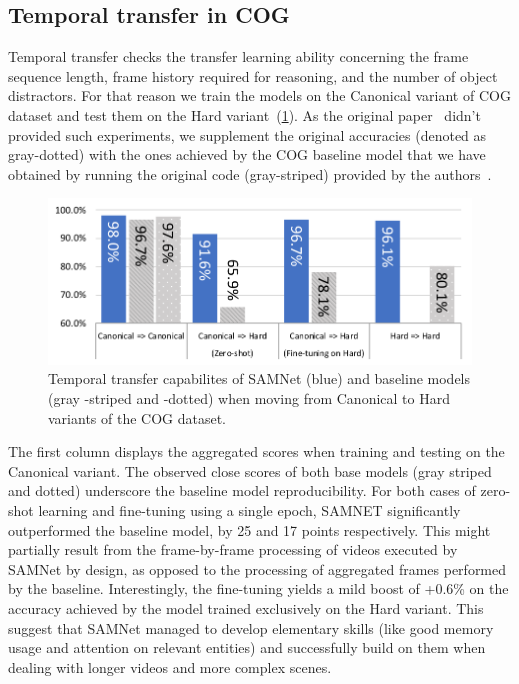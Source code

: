 \subsection{Temporal transfer in COG}
\label{sec:temporal}

Temporal transfer checks the transfer learning ability concerning the frame sequence length, frame history required for reasoning, and the number of object distractors.
For that reason we train the models on the Canonical variant of COG dataset and test them on the Hard variant~(\cref{fig:samnet_cog_overall_transfer}).
As the original paper~\cite{yang2018dataset} didn't provided such experiments, we supplement the original accuracies (denoted as gray-dotted) with the ones achieved by the COG baseline model that we have obtained by running the original code (gray-striped) provided by the authors~\cite{yang2018implement}.

\begin{figure}[htbp]
	\centering
	\includegraphics[width=\columnwidth]{../img/plots/cog_temporal_transfer_baselines.pdf}
	\caption{Temporal transfer capabilites of SAMNet (blue) and baseline models (gray -striped and -dotted) when moving from Canonical to Hard variants of the COG dataset.}
	\label{fig:samnet_cog_overall_transfer}
\end{figure}

The first column displays the aggregated scores when training and testing on the Canonical variant.
The observed close scores of both base models (gray striped and dotted) underscore the baseline model reproducibility.
For both cases of zero-shot learning and fine-tuning using a single epoch, SAMNET significantly outperformed the baseline model, by 25 and 17 points respectively.
This might partially result from the frame-by-frame processing of videos executed by SAMNet by design, as opposed to the processing of aggregated frames performed by the baseline.
Interestingly, the fine-tuning yields a mild boost of +0.6\% on the accuracy achieved by the model trained exclusively on the Hard variant.
This suggest that SAMNet managed to develop elementary skills (like good memory usage and attention on relevant entities) and successfully build on them when dealing with longer videos and more complex scenes.

